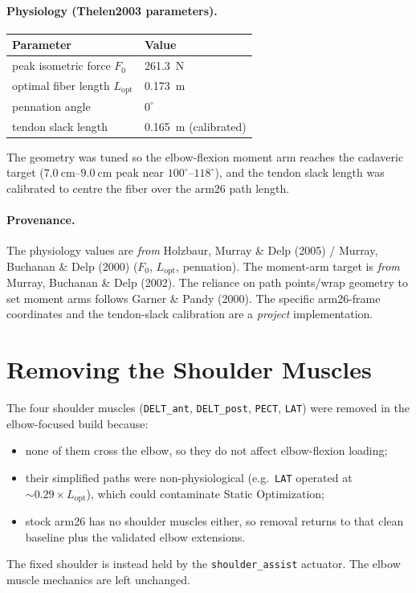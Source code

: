 \documentclass[11pt]{article}
\newcommand{\dg}{^{\circ}}
\begin{document}
\paragraph{Physiology (Thelen2003 parameters).}
\begin{table}[h]
\centering
\begin{tabular}{ll}
\toprule
\textbf{Parameter} & \textbf{Value} \\
\midrule
peak isometric force $F_0$ & \SI{261.3}{\newton} \\
optimal fiber length $L_{\text{opt}}$ & \SI{0.173}{\meter} \\
pennation angle & $0\dg$ \\
tendon slack length & \SI{0.165}{\meter} (calibrated) \\
\bottomrule
\end{tabular}
\end{table}

The geometry was tuned so the elbow-flexion moment arm reaches the cadaveric
target ($\SIrange{7.0}{9.0}{\centi\meter}$ peak near $100\dg$--$118\dg$), and the
tendon slack length was calibrated to centre the fiber over the arm26 path
length.

\paragraph{Provenance.} The physiology values are \textit{from} Holzbaur, Murray
\& Delp (2005) / Murray, Buchanan \& Delp (2000) ($F_0$, $L_{\text{opt}}$,
pennation). The moment-arm target is \textit{from} Murray, Buchanan \& Delp
(2002). The reliance on path points/wrap geometry to set moment arms follows
Garner \& Pandy (2000). The specific arm26-frame coordinates and the tendon-slack
calibration are a \textit{project} implementation.

\section{Removing the Shoulder Muscles}

The four shoulder muscles (\texttt{DELT\_ant}, \texttt{DELT\_post}, \texttt{PECT},
\texttt{LAT}) were removed in the elbow-focused build because:
\begin{itemize}\itemsep2pt
  \item none of them cross the elbow, so they do not affect elbow-flexion loading;
  \item their simplified paths were non-physiological (e.g.\ \texttt{LAT} operated
        at $\sim0.29\times L_{\text{opt}}$), which could contaminate Static Optimization;
  \item stock arm26 has no shoulder muscles either, so removal returns to that
        clean baseline plus the validated elbow extensions.
\end{itemize}
The fixed shoulder is instead held by the \texttt{shoulder\_assist} actuator. The
elbow muscle mechanics are left unchanged.
\end{document}

